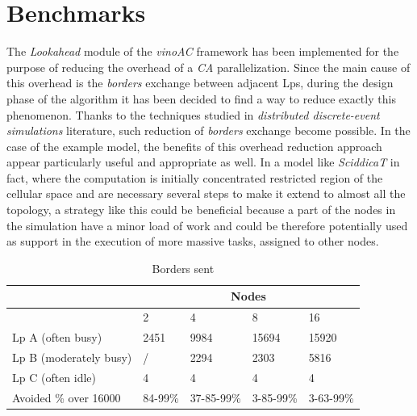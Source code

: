 \documentclass[12pt,a4paper,fleqn]{report}
\begin{document}
\section{Benchmarks}
The \textit{Lookahead} module of the \textit{vinoAC} framework has been implemented for the purpose of reducing the overhead of a \textit{CA} parallelization. Since the main cause of this overhead is the \textit{borders} exchange between adjacent Lps, during the design phase of the algorithm it has been decided to find a way to reduce exactly this phenomenon. Thanks to the techniques studied in \textit{distributed discrete-event simulations} literature, such reduction of \textit{borders} exchange become possible. In the case of the example model, the benefits of this overhead reduction approach appear particularly useful and appropriate as well. In a model like \textit{SciddicaT} in fact, where the computation is initially concentrated restricted region of the cellular space and are necessary several steps to make it extend to almost all the topology, a strategy like this could be beneficial because a part of the nodes in the simulation have a minor load of work and could be therefore potentially used as support in the execution of more massive tasks, assigned to other nodes.
\begin{table}[h!]
\centering
\label{bordersTable}
\begin{tabular}{ |p{4.5cm}|p{2cm}|p{2cm}|p{2cm}|p{2cm}|}
\hline
&\multicolumn{4}{|c|}{Nodes} \\
\hline
&2 & 4 & 8 & 16 \\
\hline
Lp A (often busy) & 2451&9984&15694&15920\\
\hline
Lp B (moderately busy) & /&2294&2303&5816\\
\hline
Lp C (often idle) & 4&4&4&4\\

\hline
Avoided \% over 16000 & 84-99\%&37-85-99\%&3-85-99\%&3-63-99\%\\

\hline
\end{tabular}
\caption{Borders sent}
\end{table}
\end{document}
